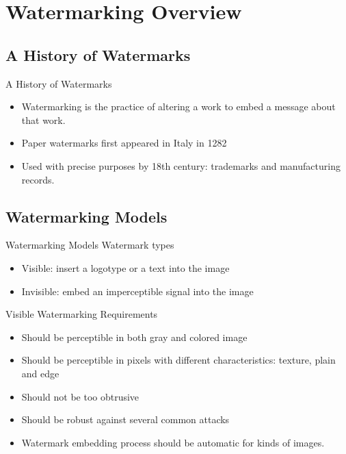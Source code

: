 \section{Watermarking Overview}
\subsection{A History of Watermarks}
\begin{frame}{A History of Watermarks}
    \begin{itemize}
        \item Watermarking is the practice of altering a work to embed a message about that work.
        \item Paper watermarks first appeared in Italy in 1282
        \item Used with precise purposes by 18th century: trademarks and manufacturing records.
    \end{itemize}
\end{frame}


\subsection{Watermarking Models}
\begin{frame}{Watermarking Models}
    Watermark types
    \begin{itemize}
        \item Visible: insert a logotype or a text into the image
        \item Invisible: embed an imperceptible signal into the image
    \end{itemize}
\end{frame}

\begin{frame}{Visible Watermarking}
    Requirements
    \begin{itemize}
        \item Should be perceptible in both gray and colored image
        \item Should be perceptible in pixels with different characteristics: texture, plain and edge
        \item Should not be too obtrusive
        \item Should be robust against several common attacks
        \item Watermark embedding process should be automatic for kinds of images.
    \end{itemize}
\end{frame}

